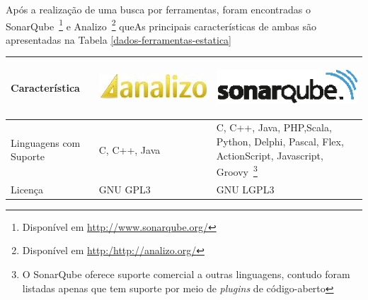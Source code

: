 Após a realização de uma busca por ferramentas, foram encontradas o SonarQube~\footnote{Disponível em \url{http://www.sonarqube.org/}} e Analizo~\footnote{Disponível em \url{http:/http://analizo.org/}} queAs principais características de ambas são apresentadas na Tabela \ref{dados-ferramentas-estatica}
\begin{savenotes}
\begin{table}[!ht]
\centering
\begin{tabular}{|p{5cm}|p{4.5cm}|p{5cm}|}
\hline

Característica 

&

\begin{center}
\includegraphics[keepaspectratio=false,scale=0.48]{figuras/analizo.eps} 
\end{center}


&



\begin{center}
\includegraphics[keepaspectratio=false,scale=0.48]{figuras/sonarqube.eps} 
\end{center}





   
\\ \hline


Linguagens com Suporte  & C, C++, Java & C, C++, Java, PHP,Scala, Python, Delphi, Pascal, Flex, ActionScript, Javascript, Groovy~\footnote{O SonarQube oferece suporte comercial a outras linguagens, contudo foram listadas apenas que tem suporte por meio de \textit{plugins} de código-aberto} \\ \hline
Licença  & GNU GPL3 & GNU LGPL3  \\ \hline




\end{tabular}
\end{table}
\end{savenotes}

